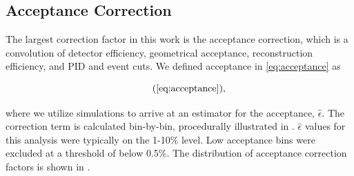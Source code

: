 \subsection{Acceptance Correction}
The largest correction factor in this work is the acceptance correction, which is a convolution of detector efficiency, geometrical acceptance, reconstruction efficiency, and PID and event cuts. We defined acceptance in \eqref{eq:acceptance} as

    \begin{equation*}
      \recallLabel{eq:acceptance},
    \end{equation*}

where we utilize simulations to arrive at an estimator for the acceptance, $\hat{\epsilon}$. The correction term is calculated bin-by-bin, procedurally illustrated in . $\hat{\epsilon}$ values for this analysis were typically on the 1-10\% level. Low acceptance bins were excluded at a threshold of below 0.5\%. The distribution of acceptance correction factors is shown in .

